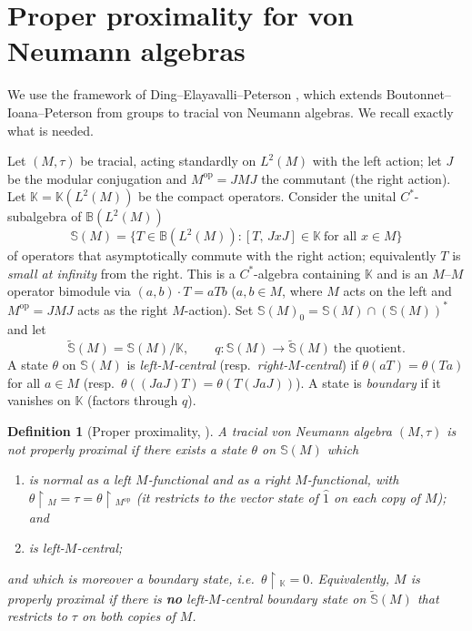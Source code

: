 \documentclass[11pt]{article}
\newtheorem{definition}{Definition}
\newcommand{\BB}{\mathbb B}
\newcommand{\KK}{\mathbb K}
\newcommand{\Lt}{L^2(M)}
\newcommand{\set}[1]{\{#1\}}
\newcommand{\rest}{\!\restriction\!}
\begin{document}
\section{Proper proximality for von Neumann algebras}\label{sec:pp}

We use the framework of Ding--Elayavalli--Peterson \cite{DEP}, which extends Boutonnet--Ioana--Peterson
\cite{BIP} from groups to tracial von Neumann algebras. We recall exactly what is needed.

Let $(M,\tau)$ be tracial, acting standardly on $\Lt$ with the left action; let $J$ be the modular
conjugation and $M^{\mathrm{op}}=JMJ$ the commutant (the right action). Let $\KK=\KK(\Lt)$ be the compact
operators. Consider the unital $C^*$-subalgebra of $\BB(\Lt)$
\begin{equation}\label{eq:smallinfty}
\mathbb S(M)=\set{T\in\BB(\Lt) : [T,\,J x J]\in\KK\ \text{for all } x\in M }
\end{equation}
of operators that asymptotically commute with the right action; equivalently $T$ is \emph{small at
infinity} from the right. This is a $C^*$-algebra containing $\KK$ and is an $M$--$M$ operator bimodule via
$(a,b)\cdot T=aTb$ ($a,b\in M$, where $M$ acts on the left and $M^{\mathrm{op}}=JMJ$ acts as the right
$M$-action). Set $\mathbb S(M)_0=\mathbb S(M)\cap (\mathbb S(M))^{*}$ and let
\begin{equation}\label{eq:quotient}
\widetilde{\mathbb S}(M)=\mathbb S(M)/\KK,
\qquad q:\mathbb S(M)\to\widetilde{\mathbb S}(M)\ \text{the quotient.}
\end{equation}
A state $\theta$ on $\mathbb S(M)$ is \emph{left-$M$-central} (resp.\ \emph{right-$M$-central}) if
$\theta(aT)=\theta(Ta)$ for all $a\in M$ (resp.\ $\theta((JaJ)T)=\theta(T(JaJ))$). A state is
\emph{boundary} if it vanishes on $\KK$ (factors through $q$).

\begin{definition}[Proper proximality, \cite{DEP}]\label{def:pp}
A tracial von Neumann algebra $(M,\tau)$ is \emph{not properly proximal} if there exists a state $\theta$ on
$\mathbb S(M)$ which
\begin{enumerate}
\item[(i)] is \emph{normal} as a left $M$-functional and as a right $M$-functional, with
$\theta\rest_{M}=\tau=\theta\rest_{M^{\mathrm{op}}}$ (it restricts to the vector state of $\hat 1$ on each
copy of $M$); and
\item[(ii)] is left-$M$-central;
\end{enumerate}
\emph{and} which is moreover a \emph{boundary} state, i.e.\ $\theta\rest_{\KK}=0$. Equivalently, $M$ is
\emph{properly proximal} if there is \textbf{no} left-$M$-central boundary state on
$\widetilde{\mathbb S}(M)$ that restricts to $\tau$ on both copies of $M$.
\end{definition}
\end{document}
